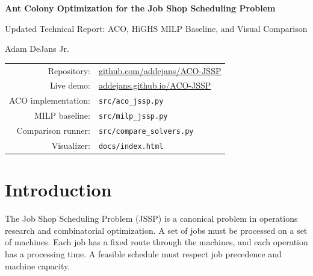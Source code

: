 \documentclass[11pt]{article}
\newcommand{\repo}{\href{https://github.com/addejans/ACO-JSSP}{github.com/addejans/ACO-JSSP}}
\newcommand{\demo}{\href{https://addejans.github.io/ACO-JSSP/}{addejans.github.io/ACO-JSSP}}
\begin{document}
\begin{titlepage}\centering\vspace*{0.55in}
{\Huge\bfseries Ant Colony Optimization for the Job Shop Scheduling Problem\par}\vspace{0.25in}
{\Large Updated Technical Report: ACO, HiGHS MILP Baseline, and Visual Comparison\par}\vspace{0.45in}
{\large Adam DeJans Jr.\par}\vspace{0.12in}{\large June 2026\par}\vfill
\begin{tabular}{rl}Repository: & \repo \\ Live demo: & \demo \\ ACO implementation: & \texttt{src/aco\_jssp.py} \\ MILP baseline: & \texttt{src/milp\_jssp.py} \\ Comparison runner: & \texttt{src/compare\_solvers.py} \\ Visualizer: & \texttt{docs/index.html}\end{tabular}\vfill
\begin{abstract}
This report updates the original ACO-JSSP project documentation to reflect the modern Python 3 solver, generated instances, browser-based Gantt visualizer, HiGHS mixed-integer linear programming baseline, comparison runner, test suite, and GitHub Pages deployment. The project demonstrates how Ant Colony Optimization can be used as a constructive metaheuristic for the Job Shop Scheduling Problem and how a solver-backed MILP formulation can measure optimality gaps on smaller instances. The current implementation separates problem parameters from algorithm parameters, supports generated instances, applies a remaining-work-aware transition heuristic, mixes exploration with exploitation, reinforces both iteration-best and global-best solutions, applies pair-swap local search, and compares heuristic schedules against exact or bounded exact results.
\end{abstract}\vfill\end{titlepage}
\tableofcontents\newpage
\section{Introduction}
The Job Shop Scheduling Problem (JSSP) is a canonical problem in operations research and combinatorial optimization. A set of jobs must be processed on a set of machines. Each job has a fixed route through the machines, and each operation has a processing time. A feasible schedule must respect job precedence and machine capacity.
\end{document}
